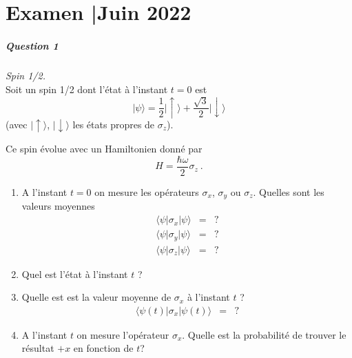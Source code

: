 
\chapter*{Examen \hsp\textcolor{gray75}{|}\hsp Juin 2022}

\paragraph{Question 1} \textit{Spin 1/2.} \\

Soit un spin  1/2 dont l'état à l'instant $t=0$ est
\begin{equation}
\vert \psi \rangle =  \frac{1}{2} \lvert \uparrow \rangle + 
 \frac{\sqrt{3} }{2} \lvert \downarrow \rangle
\end{equation}
(avec $\lvert \uparrow \rangle$, 
$\lvert \downarrow \rangle$ les états propres de $\sigma_z$).

Ce spin évolue avec un Hamiltonien donné par 
\begin{equation}
H = \frac{\hbar \omega }{2}\sigma_z\ .
\end{equation}

\begin{enumerate}
\item 
A l'instant $t=0$ on mesure les opérateurs $\sigma_x$, $\sigma_y$ ou $\sigma_z$.
Quelles sont les valeurs moyennes
\begin{eqnarray}
\langle \psi \rvert \sigma_x \lvert \psi \rangle &=& ?\nonumber\\
\langle \psi \rvert \sigma_y \lvert \psi \rangle &=& ?\nonumber\\
\langle \psi \rvert \sigma_z \lvert \psi \rangle &=& ?\nonumber
\end{eqnarray}

\item

Quel est l'état à l'instant $t$ ?

\item

Quelle est est la valeur moyenne de $\sigma_x$  à l'instant $t$ ?
\begin{eqnarray}
\langle \psi (t)\rvert \sigma_x \lvert \psi (t)\rangle &=& ?\nonumber
\end{eqnarray}

\item 
A l'instant $t$ on mesure l'opérateur $\sigma_x$. Quelle est la probabilité de trouver le résultat $+x$ en fonction de $t$?

\end{enumerate}


